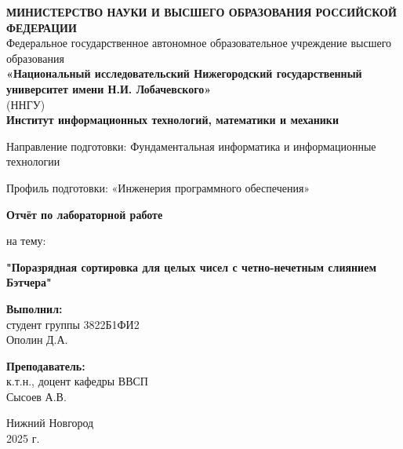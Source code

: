 \documentclass[12pt,a4paper]{extarticle}
\begin{document}
	\begin{titlepage}
		\begin{center}

			\onehalfspacing

			\begin{center}
				\textbf{МИНИСТЕРСТВО НАУКИ И ВЫСШЕГО ОБРАЗОВАНИЯ РОССИЙСКОЙ ФЕДЕРАЦИИ} \\ 			
				\vspace{0.5cm}
				Федеральное государственное автономное образовательное учреждение высшего образования \\ 
				\vspace{0.5cm}
				\textbf{«Национальный исследовательский Нижегородский государственный университет имени Н.И. Лобачевского»} \\
				(ННГУ)\\
				\vspace{0.5cm}
				\textbf{Институт информационных технологий, математики и механики}
			\end{center}
			\vspace{0.5cm}
			\begin{center}
			Направление подготовки: Фундаментальная информатика и информационные технологии


			Профиль подготовки: «Инженерия программного обеспечения»
			\end{center}
			\vspace{2.5cm}
			\begin{center}
				\textbf{Отчёт по лабораторной работе}

				на тему: 

				\textbf{"Поразрядная сортировка для целых чисел с четно-нечетным слиянием Бэтчера"}
			\end{center}

			\vspace{2.5cm}

			\begin{flushright}
				\textbf{Выполнил:} \\
				студент группы 3822Б1ФИ2 \\
				Ополин Д.А. \\

				\vspace{1cm}

			\noindent\textbf{Преподаватель:} \\
			к.т.н., доцент кафедры ВВСП \\
			{Сысоев А.В.}
			\end{flushright}

			\vspace{2em}

			\vfill

			\begin{center}
				Нижний Новгород \\
				2025 г.
			\end{center}

		\end{center}
	\end{titlepage}
\end{document}
